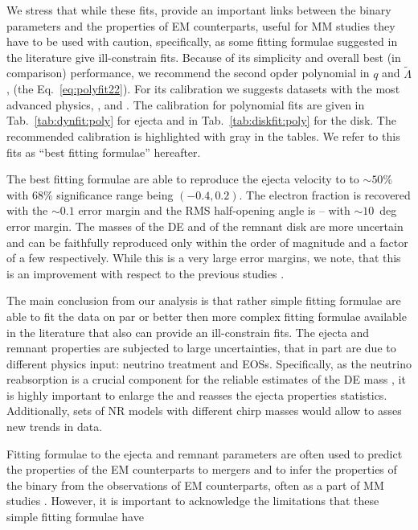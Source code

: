 We stress that while these fits, provide an important links between the binary parameters 
and the properties of \ac{EM} counterparts, useful for \ac{MM} studies 
they have to be used with caution, specifically, as some fitting formulae suggested in the 
literature give ill-constrain fits.
Because of its simplicity and overall best (in comparison) performance, we recommend the 
second opder polynomial in $q$ and $\tilde{\Lambda}$, (the Eq.~\eqref{eq:polyfit22}).
For its calibration we suggests datasets with the most advanced physics, \ie, 
\DSrefset{} and \DSheatcool{}.
The calibration for polynomial fits are given in Tab.~\ref{tab:dynfit:poly} for ejecta 
and in Tab.~\ref{tab:diskfit:poly} for the disk. The recommended calibration is highlighted 
with gray in the tables.
We refer to this fits as ``best fitting formulae'' hereafter.

The best fitting formulae are able to reproduce the ejecta velocity to to ${\sim}50\%$ with 
$68\%$ significance range being $(-0.4,0.2)$. The electron fraction is recovered with the 
${\sim}0.1$ error margin and the \ac{RMS} half-opening angle is -- with ${\sim}10$~deg
error margin.
The masses of the \ac{DE} and of the remnant disk are more uncertain and can be faithfully 
reproduced only within the order of magnitude and a factor of a few respectively. 
While this is a very large error margins, we note, that this is an improvement with 
respect to the previous studies \citep[\eg][]{Dietrich:2016fpt}.

The main conclusion from our analysis is that rather simple fitting formulae are able 
to fit the data on par or better then more complex fitting formulae available in the 
literature that also can provide an ill-constrain fits.
The ejecta and remnant properties are subjected to large uncertainties, that in part 
are due to different physics input: neutrino treatment and \acp{EOS}.
Specifically, as the neutrino reabsorption is a crucial component for the reliable 
estimates of the \ac{DE} mass 
\citep[\eg][]{Wanajo:2014wha,Sekiguchi:2015dma,Perego:2017wtu,Foucart:2018gis},
it is highly important to enlarge the \DSheatcool{} and reasses the ejecta properties 
statistics. 
Additionally, sets of \ac{NR} models with different chirp masses would allow to asses 
new trends in data.

Fitting formulae to the ejecta and remnant parameters are often used to predict the 
properties of the \ac{EM} counterparts to mergers and to infer the properties of the 
binary from the observations of \ac{EM} counterparts, often as a part of \ac{MM} studies 
\citep{Dietrich:2020efo,Breschi:2021tbm,Nicholl:2021abc}.
However, it is important to acknowledge the limitations that these simple 
fitting formulae have 

